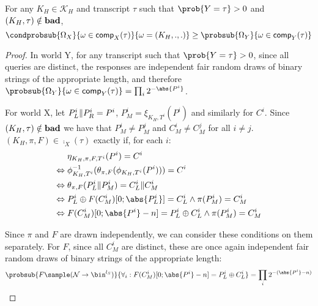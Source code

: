 \documentclass[eprint.tex]{subfiles}
\begin{document}
\begin{lemma} \label{notbad}
    For any $K_H \in \mathcal{K}_H$ and transcript $\tau$ such that $\prob{Y = \tau} > 0$ and
    $(K_H, \tau) \notin \operatorname{\mathbf{bad}}$,
    \begin{displaymath}
        \condprobsub{\Omega_X}{\omega \in \comp_X(\tau)}{\omega = (K_H, ., .)}
        \geq
        \probsub{\Omega_Y}{\omega \in \comp_Y(\tau)}
    \end{displaymath}
\end{lemma}

\begin{proof}
    In world Y, for any transcript such that $\prob{Y = \tau} > 0$,
    since all queries are distinct, the responses are independent fair random draws of
    binary strings of the appropriate length, and therefore
    $\probsub{\Omega_Y}{\omega \in \comp_Y(\tau)} = \prod_i 2^{-\abs{P^i}}$.

    For world X,
    let $P_L^i \Vert P_R^i = P^i$, $P_M^i = \xi_{K_H, T^i}(P^i)$ and similarly for $C^i$.
    Since $(K_H, \tau) \notin \operatorname{\mathbf{bad}}$ we have that $P_M^i \neq P_M^j$
    and $C_M^i \neq C_M^j$ for all $i \neq j$.
    $(K_H, \pi, F) \in \comp_X(\tau)$ exactly if, for each $i$:
    \begin{align*}
        {}& \eta_{K_H, \pi, F, T^i}(P^i) = C^i\\
        \Leftrightarrow {}& \phi_{K_H,T^i}^{-1}(\theta_{\pi, F}(\phi_{K_H,T^i}(P^i))) = C^i\\
        \Leftrightarrow {}& \theta_{\pi, F}(P_L^i \Concat P_M^i) = C_L^i \Concat C_M^i \\
        \Leftrightarrow {}& P_L^i \oplus F(C_M^i)[0;\abs{P_L^i}] = C_L^i \wedge \pi(P_M^i) = C_M^i \\
        \Leftrightarrow {}& F(C_M^i)[0;\abs{P^i} - n] = P_L^i \oplus C_L^i \wedge \pi(P_M^i) = C_M^i \\
    \end{align*}

    Since $\pi$ and $F$ are drawn independently, we can consider these conditions on them
    separately. For $F$, since all $C_M^i$ are distinct,
    these are once again independent fair random draws of
    binary strings of the appropriate length:
    \begin{displaymath}
        \probsub{
            F \sample (\mathcal{N} \rightarrow \bin^{l_S})
        }{
            \forall_i : F(C_M^i)[0;\abs{P^i} - n] = P_L^i \oplus C_L^i
        } = \prod_i 2^{-(\abs{P^i} - n)}
    \end{displaymath}


\end{proof}
\end{document}
